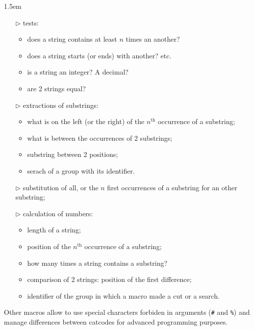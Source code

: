\documentclass[english,a4paper,10pt]{article}
\renewcommand\th{${}^\text{th}$\xspace}
\begin{document}
\begin{titlepage}
\begin{center}
\begin{minipage}{0.85\linewidth}
			\parindent1.5em
			\begin{itemize}
				\item[$\triangleright$] tests:
					\begin{itemize}
						\item does a string contains at least $n$ times an another?
						\item does a string starts (or ends) with another? etc.
						\item is a string an integer? A decimal?
						\item are 2 strings equal?
					\end{itemize}
				\item[$\triangleright$] extractions of substrings:
					\begin{itemize}
						\item what is on the left (or the right) of the $n$\th occurrence of a substring;
						\item what is between the occurrences of 2 substrings;
						\item substring between 2 positions;
						\item serach of a group with its identifier.
					\end{itemize}
				\item[$\triangleright$] substitution of all, or the $n$ first occurrences of a substring for an other substring;
				\item[$\triangleright$] calculation of numbers:
					\begin{itemize}
						\item length of a string;
						\item position of the $n$\th occurrence of a substring;
						\item how many times a string contains a substring?
						\item comparison of 2 strings: position of the first difference;
						\item identifier of the group in which a macro made a cut or a search.
					\end{itemize}
			\end{itemize}
			\parindent0pt
			\medskip
			Other macros allow to use special characters forbiden in arguments (\verb|#| and \verb|%|) and manage differences between catcodes for advanced programming purposes.
		\end{minipage}
	\end{center}
	\hrulefill\vfill{}
\end{titlepage}
\end{document}
